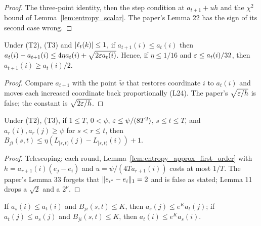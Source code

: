 \begin{proof}
  \leanok
  The three-point identity, then the step condition at $a_{t+1} + uh$ and the $\chi^2$ bound of
  Lemma~\ref{lem:entropy_scalar}. The paper's Lemma 22 has the sign of its second case wrong.
\end{proof}

\begin{lemma}
  \label{lem:entropy_step_size}
  \leanok
  Under (T2), (T3) and $\lvert \ell_t(k) \rvert \le 1$, if $a_{t+1}(i) \le a_t(i)$ then
  $a_t(i) - a_{t+1}(i) \le 4\eta a_t(i) + \sqrt{2\varepsilon a_t(i)}$. Hence, if $\eta \le 1/16$ and
  $\varepsilon \le a_t(i)/32$, then $a_{t+1}(i) \ge a_t(i)/2$.
\end{lemma}

\begin{proof}
  \leanok
  Compare $a_{t+1}$ with the point $\tilde w$ that restores coordinate $i$ to $a_t(i)$ and moves
  each increased coordinate back proportionally (L24). The paper's $\sqrt{\varepsilon/h}$ is false; the
  constant is $\sqrt{2\varepsilon/h}$.
\end{proof}

\begin{lemma}
  \label{lem:entropy_balance}
  \leanok
  Under (T2), (T3), if $1 \le T$, $0 < \psi$, $\varepsilon \le \psi/(8T^2)$, $s \le t \le T$, and
  $a_r(i), a_r(j) \ge \psi$ for $s < r \le t$, then
  $B_{ji}(s, t) \le \eta(L_{[s,t)}(j) - L_{[s,t)}(i)) + 1$.
\end{lemma}

\begin{proof}
  \leanok
  Telescoping; each round, Lemma~\ref{lem:entropy_approx_first_order} with
  $h = a_{r+1}(i)(e_j - e_i)$ and $u = \psi/(4T a_{r+1}(i))$ costs at most $1/T$. The paper's
  Lemma 33 forgets that $\lVert e_{i^*} - e_i \rVert_1 = 2$ and is false as stated; Lemma 11 drops a
  $\sqrt2$ and a $2^\nu$.
\end{proof}

\begin{lemma}
  \label{lem:entropy_coordinate_bounds}
  \leanok
  If $a_s(i) \le a_t(i)$ and $B_{ji}(s, t) \le K$, then $a_s(j) \le e^K a_t(j)$; if
  $a_t(j) \le a_s(j)$ and $B_{ji}(s, t) \le K$, then $a_t(i) \le e^K a_s(i)$.
\end{lemma}

